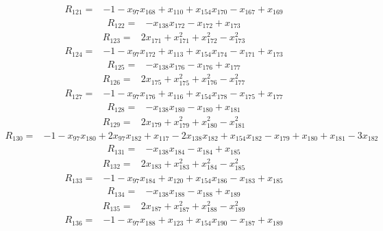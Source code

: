 \begin{align*}
 R_{121}={}&-1 -x_{97}x_{168} +x_{110} +x_{154}x_{170} -x_{167} +x_{169}
\end{align*}
\begin{align*}
 R_{122}={}&-x_{138}x_{172} -x_{172} +x_{173}
\end{align*}
\begin{align*}
 R_{123}={}&2x_{171} +x_{171}^{2} +x_{172}^{2} -x_{173}^{2}
\end{align*}
\begin{align*}
 R_{124}={}&-1 -x_{97}x_{172} +x_{113} +x_{154}x_{174} -x_{171} +x_{173}
\end{align*}
\begin{align*}
 R_{125}={}&-x_{138}x_{176} -x_{176} +x_{177}
\end{align*}
\begin{align*}
 R_{126}={}&2x_{175} +x_{175}^{2} +x_{176}^{2} -x_{177}^{2}
\end{align*}
\begin{align*}
 R_{127}={}&-1 -x_{97}x_{176} +x_{116} +x_{154}x_{178} -x_{175} +x_{177}
\end{align*}
\begin{align*}
 R_{128}={}&-x_{138}x_{180} -x_{180} +x_{181}
\end{align*}
\begin{align*}
 R_{129}={}&2x_{179} +x_{179}^{2} +x_{180}^{2} -x_{181}^{2}
\end{align*}
\begin{align*}
 R_{130}={}&-1 -x_{97}x_{180} +2x_{97}x_{182} +x_{117} -2x_{138}x_{182} +x_{154}x_{182} -x_{179} +x_{180} +x_{181} -3x_{182}
\end{align*}
\begin{align*}
 R_{131}={}&-x_{138}x_{184} -x_{184} +x_{185}
\end{align*}
\begin{align*}
 R_{132}={}&2x_{183} +x_{183}^{2} +x_{184}^{2} -x_{185}^{2}
\end{align*}
\begin{align*}
 R_{133}={}&-1 -x_{97}x_{184} +x_{120} +x_{154}x_{186} -x_{183} +x_{185}
\end{align*}
\begin{align*}
 R_{134}={}&-x_{138}x_{188} -x_{188} +x_{189}
\end{align*}
\begin{align*}
 R_{135}={}&2x_{187} +x_{187}^{2} +x_{188}^{2} -x_{189}^{2}
\end{align*}
\begin{align*}
 R_{136}={}&-1 -x_{97}x_{188} +x_{123} +x_{154}x_{190} -x_{187} +x_{189}
\end{align*}
